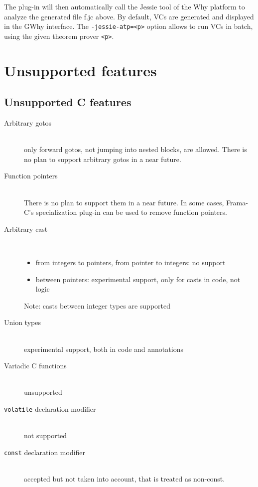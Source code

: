 \documentclass[a4paper,11pt,twoside,openright]{report}
\begin{document}
The plug-in will then automatically call the Jessie tool of the Why
platform to analyze the generated file f.jc above. By default, VCs are
generated and displayed in the GWhy interface. The
\verb|-jessie-atp=<p>| option allows to run VCs in batch, using the
given theorem prover \texttt{<p>}.


\section{Unsupported features}

\subsection{Unsupported C features}

\begin{description}
\item[Arbitrary gotos] ~\\
  only forward gotos, not jumping into nested
  blocks, are allowed. There is no plan to support arbitrary gotos in
  a near future.
\item[Function pointers] ~\\
  There is no plan to support them in a near
  future. In some cases, Frama-C's specialization plug-in can be used to
  remove function pointers.
\item[Arbitrary cast] ~\\
  \begin{itemize}
  \item from integers to pointers, from pointer to integers: no support
  \item between pointers: experimental support, only for casts in code, not logic
  \end{itemize}
  Note: casts between integer types are supported
\item[Union types] ~\\
  experimental support, both in code and annotations
\item[Variadic C functions] ~\\
  unsupported

\item[\texttt{volatile} declaration modifier]~\\
  not supported
\item[\texttt{const} declaration modifier]~\\
  accepted but not taken into account, that is treated as non-const.

\end{description}
\end{document}

